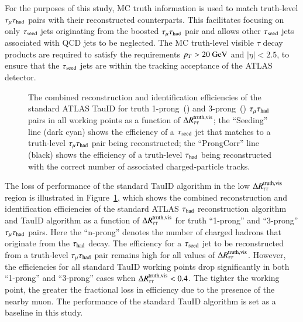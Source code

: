         For the purposes of this study, MC truth information is used to match truth-level $\tau_\mathrm{\mu}\tau_\mathrm{had}$ pairs with 
        their reconstructed counterparts. This facilitates focusing on only $\tau_\mathrm{seed}$ jets originating 
        from the boosted $\tau_\mathrm{\mu}\tau_\mathrm{had}$ pair and allows other $\tau_\mathrm{seed}$ jets associated with QCD jets to be neglected. 
        The MC truth-level visible $\tau$ decay products are required to satisfy the 
        requirements $p_T > 20\text{ \ensuremath{\text{GeV}}}$ and $|\eta| < 2.5$, to ensure that the $\tau_\mathrm{seed}$ jets 
        are within the tracking acceptance of the ATLAS detector. 

        \begin{figure}[hbtp]
            \begin{center}
                \caption{The combined reconstruction and identification efficiencies of the standard ATLAS TauID for 
                    truth 1-prong~(\protect{}) and 3-prong~(\protect{}) $\tau_\mathrm{\mu}\tau_\mathrm{had}$ pairs 
                    in all working points as a function of $\Delta R^\mathrm{truth, vis}_\mathrm{\tau\tau}$; the ``Seeding'' line 
                    (dark cyan) shows the efficiency of a $\tau_\mathrm{seed}$ jet that matches to a truth-level $\tau_\mathrm{\mu}\tau_\mathrm{had}$ pair being 
                    reconstructed; the ``ProngCorr'' line (black) shows the efficiency of a truth-level $\tau_{\text{had}}$ being 
                    reconstructed with the correct number of associated charged-particle tracks.
                }
                \label{fig:murm:effi_off}
            \end{center}
        \end{figure}

        The loss of performance of the standard TauID algorithm in the low $\Delta R^\mathrm{truth, vis}_\mathrm{\tau\tau}$ 
        region is illustrated in Figure~\ref{fig:murm:effi_off}, which shows the combined reconstruction and identification efficiencies of 
        the standard ATLAS $\tau_{\text{had}}$ reconstruction algorithm and TauID algorithm as a function of $\Delta R^\mathrm{truth, vis}_\mathrm{\tau\tau}$ for truth ``1-prong'' and ``3-prong'' 
        $\tau_\mathrm{\mu}\tau_\mathrm{had}$ pairs. Here the ``n-prong'' denotes the number of charged hadrons that originate from the $\tau_{\text{had}}$ decay. 
        The efficiency for a $\tau_\mathrm{seed}$ jet to be reconstructed from a truth-level $\tau_\mathrm{\mu}\tau_\mathrm{had}$ pair remains high for all 
        values of $\Delta R^\mathrm{truth, vis}_\mathrm{\tau\tau}$. However, the efficiencies for all standard TauID working 
        points drop significantly in both ``1-prong'' and ``3-prong'' cases when $\Delta R^\mathrm{truth, vis}_\mathrm{\tau\tau} < 0.4$. 
        The tighter the working point, the greater the fractional loss in efficiency due to the presence of the nearby
        muon. The performance of the standard TauID algorithm is set as a baseline in this study.

